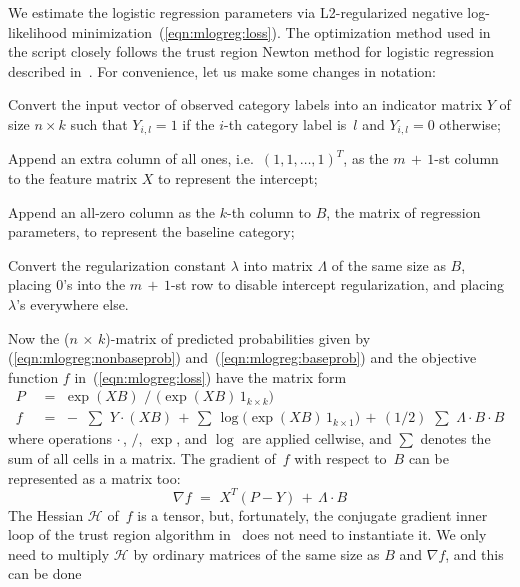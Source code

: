 We estimate the logistic regression parameters via L2-regularized negative
log-likelihood minimization~(\ref{eqn:mlogreg:loss}).
The optimization method used in the script closely follows the trust region
Newton method for logistic regression described in~\cite{Lin2008:logistic}.
For convenience, let us make some changes in notation:
\begin{Itemize}
\item Convert the input vector of observed category labels into an indicator matrix $Y$
of size $n \times k$ such that $Y_{i, l} = 1$ if the $i$-th category label is~$l$ and
$Y_{i, l} = 0$ otherwise;
\item Append an extra column of all ones, i.e.\ $(1, 1, \ldots, 1)^T$, as the
$m\,{+}\,1$-st column to the feature matrix $X$ to represent the intercept;
\item Append an all-zero column as the $k$-th column to $B$, the matrix of regression
parameters, to represent the baseline category;
\item Convert the regularization constant $\lambda$ into matrix $\Lambda$ of the same
size as $B$, placing 0's into the $m\,{+}\,1$-st row to disable intercept regularization,
and placing $\lambda$'s everywhere else.
\end{Itemize}
Now the ($n\,{\times}\,k$)-matrix of predicted probabilities given
by (\ref{eqn:mlogreg:nonbaseprob}) and~(\ref{eqn:mlogreg:baseprob})
and the objective function $f$ in~(\ref{eqn:mlogreg:loss}) have the matrix form
\begin{align*}
P \,\,&=\,\, \exp(XB) \,\,/\,\, \big(\exp(XB)\,1_{k\times k}\big)\\
f \,\,&=\,\, - \,\,{\textstyle\sum} \,\,Y \cdot (X B)\, + \,
{\textstyle\sum}\,\log\big(\exp(XB)\,1_{k\times 1}\big) \,+ \,
(1/2)\,\, {\textstyle\sum} \,\,\Lambda \cdot B \cdot B
\end{align*}
where operations $\cdot\,$, $/$, $\exp$, and $\log$ are applied cellwise,
and $\textstyle\sum$ denotes the sum of all cells in a matrix.
The gradient of~$f$ with respect to~$B$ can be represented as a matrix too:
\begin{equation*}
\nabla f \,\,=\,\, X^T (P - Y) \,+\, \Lambda \cdot B
\end{equation*}
The Hessian $\mathcal{H}$ of~$f$ is a tensor, but, fortunately, the conjugate
gradient inner loop of the trust region algorithm in~\cite{Lin2008:logistic}
does not need to instantiate it.  We only need to multiply $\mathcal{H}$ by
ordinary matrices of the same size as $B$ and $\nabla f$, and this can be done
